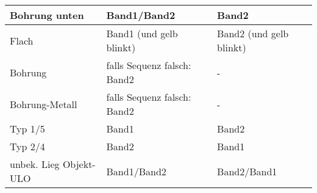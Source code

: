 \documentclass[
   draft=false
  ,paper=a4
  ,twoside=false
  ,fontsize=11pt
  ,headsepline
  ,DIV11
  ,parskip=full+
]{scrartcl} %
\begin{document}
\begin{longtable}{
	|p{0.30\txtw} %
	|p{0.30\txtw} %
	|p{0.30\txtw} %
|}
	\tablehead

 
	Bohrung unten & Band1/Band2 & Band2 \\ \hline

	Flach & Band1 (und gelb blinkt) & Band2 (und gelb blinkt) \\ \hline


	Bohrung & falls Sequenz falsch: Band2 & - \\ \hline

	Bohrung-Metall & falls Sequenz falsch: Band2 & -  \\ \hline		

	Typ 1/5 & Band1 & Band2 \\ \hline

	Typ 2/4 & Band2 & Band1 \\ \hline

	unbek. Lieg Objekt-ULO & Band1/Band2 & Band2/Band1 \\ \hline


\end{longtable}

\vspace{-2.5em}
\footnotesize

\normalsize



\flushleft
\end{document}
